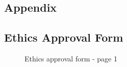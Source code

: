 \documentclass{l4proj}
\begin{document}
\begin{appendices}
\chapter{Appendix}

\section{Ethics Approval Form}

\begin{figure}[H]
\centering
{}
\caption{Ethics approval form - page 1}
\label{appendix:approval-part-1}
\end{figure}


\end{appendices}
\end{document}
